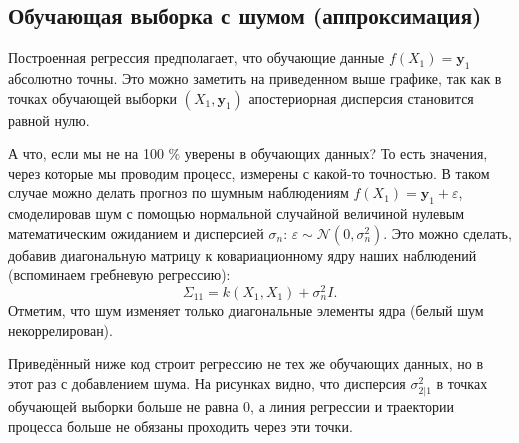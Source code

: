 \documentclass[11pt,a4paper]{article}
\begin{document}
    \hypertarget{ux43eux431ux443ux447ux430ux44eux449ux430ux44f-ux432ux44bux431ux43eux440ux43aux430-ux441-ux448ux443ux43cux43eux43c-ux430ux43fux43fux440ux43eux43aux441ux438ux43cux430ux446ux438ux44f}{%
\subsection{Обучающая выборка с шумом
(аппроксимация)}\label{ux43eux431ux443ux447ux430ux44eux449ux430ux44f-ux432ux44bux431ux43eux440ux43aux430-ux441-ux448ux443ux43cux43eux43c-ux430ux43fux43fux440ux43eux43aux441ux438ux43cux430ux446ux438ux44f}}

    Построенная регрессия предполагает, что обучающие данные
\(f(X_1) = \mathbf{y}_1\) абсолютно точны. Это можно заметить на
приведенном выше графике, так как в точках обучающей выборки
\((X_1,\mathbf{y}_1)\) апостериорная дисперсия становится равной нулю.

А что, если мы не на 100 \% уверены в обучающих данных? То есть
значения, через которые мы проводим процесс, измерены с какой-то
точностью. В таком случае можно делать прогноз по шумным наблюдениям
\(f(X_1) = \mathbf{y}_1 + \varepsilon\), смоделировав шум с помощью
нормальной случайной величиной нулевым математическим ожиданием и
дисперсией \(\sigma_n\):
\(\varepsilon \sim \mathcal{N}(0, \sigma_n^2)\). Это можно сделать,
добавив диагональную матрицу к ковариационному ядру наших наблюдений
(вспоминаем гребневую регрессию): \[
  \Sigma_{11} = k(X_1,X_1) + \sigma_n^2 I.
\] Отметим, что шум изменяет только диагональные элементы ядра (белый
шум некоррелирован).

    Приведённый ниже код строит регрессию не тех же обучающих данных, но в
этот раз с добавлением шума. На рисунках видно, что дисперсия
\(\sigma_{2|1}^2\) в точках обучающей выборки больше не равна 0, а линия
регрессии и траектории процесса больше не обязаны проходить через эти
точки.
\end{document}
